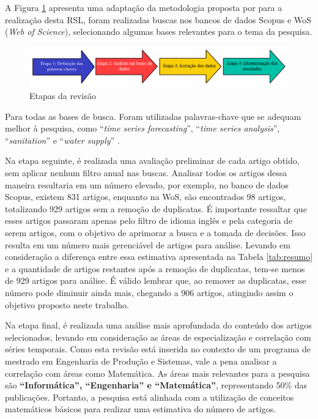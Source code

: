 A Figura \ref{fig:rsl} apresenta uma adaptação da metodologia proposta por  para a realização desta RSL, foram realizadas buscas nos bancos de dados Scopus e WoS (\textit{Web of Science}), selecionando algumas bases relevantes para o tema da pesquisa.

\begin{figure}[H]
	\centering
	\caption{Etapas da revisão}
	\label{fig:rsl}
	\includegraphics[width=\linewidth]{Revisao/Figuras/RSL}
	
\end{figure}

Para todas as bases de busca. Foram utilizadas palavras-chave que se adequam melhor à pesquisa, como ``\textit{time series forecasting}'', ``\textit{time series analysis}'', ``\textit{sanitation}'' e ``\textit{water supply}'' .


Na etapa seguinte, é realizada uma avaliação preliminar de cada artigo obtido, sem aplicar nenhum filtro anual nas buscas. Analisar todos os artigos dessa maneira resultaria em um número elevado, por exemplo, no banco de dados Scopus, existem 831 artigos, enquanto na WoS, são encontrados 98 artigos, totalizando 929 artigos sem a remoção de duplicatas. É importante ressaltar que esses artigos passaram apenas pelo filtro de idioma inglês e pela categoria de serem artigos, com o objetivo de aprimorar a busca e a tomada de decisões. Isso resulta em um número mais gerenciável de artigos para análise. Levando em consideração a diferença entre essa estimativa apresentada na Tabela \ref{tab:resumo} e a quantidade de artigos restantes após a remoção de duplicatas, tem-se menos de 929 artigos para análise. É válido lembrar que, ao remover as duplicatas, esse número pode diminuir ainda mais, chegando a 906 artigos, atingindo assim o objetivo proposto neste trabalho.

Na etapa final, é realizada uma análise mais aprofundada do conteúdo dos artigos selecionados, levando em consideração as áreas de especialização e correlação com séries temporais. Como esta revisão está inserida no contexto de um programa de mestrado em Engenharia de Produção e Sistemas, vale a pena analisar a correlação com áreas como Matemática. As áreas mais relevantes para a pesquisa são \textbf{``Informática'', ``Engenharia'' e ``Matemática''}, representando 50\% das publicações. Portanto, a pesquisa está alinhada com a utilização de conceitos matemáticos básicos para realizar uma estimativa do número de artigos.


